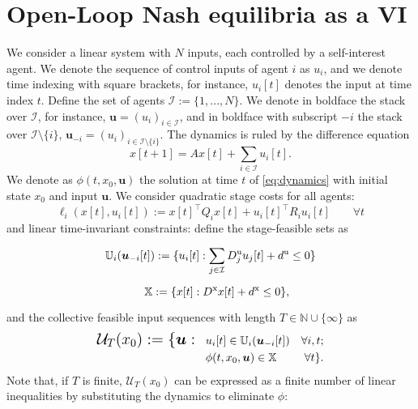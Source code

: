 \documentclass[letterpaper, 10 pt, conference]{ieeeconf}  %
\newcommand{\N}{\mathbb{N}}
\newcommand{\mc}{\mathcal}
\newcommand{\bs}{\boldsymbol}
\newcommand{\bu}{\boldsymbol{u}}
\newcommand{\Dx}{D^{\text{x}}}
\newcommand{\Du}{D^{\text{u}}}
\newcommand{\dx}{d^{\text{x}}}
\newcommand{\du}{d^{\text{u}}}
\newcommand{\X}{\mathbb{X}}
\newcommand{\U}{\mathbb{U}}
\begin{document}
\section{Open-Loop Nash equilibria as a VI}\label{sec: OL-NE as VI}
We consider a linear system with $N$ inputs, each controlled by a self-interest agent. We denote the sequence of control inputs of agent $i$ as $u_i$, and we denote time indexing with square brackets, for instance, $u_i[t]$ denotes the input at time index $t$. Define the set of agents $\mc I:=\{1,...,N\}$. We denote in boldface the stack over $\mc I$, for instance, $\bs{u}=(u_i)_{i\in\mc I}$, and in boldface with subscript $-i$ the stack over $\mc I \setminus \{i\}$, $\bs{u}_{-i}=(u_i)_{i\in\mc I \setminus \{i\}}$. The dynamics is ruled by the difference equation
\begin{equation}\label{eq:dynamics}
    x[t+1] = Ax[t] + \sum_{i\in\mc I} u_i[t].
\end{equation} 
We denote as $\phi(t, x_0, \bu)$ the solution at time $t$ of \eqref{eq:dynamics} with initial state $x_0$ and input $\bu$. We consider quadratic stage costs for all agents:
\begin{equation}
    \ell_i(x[t],u_i[t]):= x[t]^{\top}Q_ix[t] + u_i[t]^{\top}R_iu_i[t] \qquad \forall t
\end{equation}
and linear time-invariant constraints: define the stage-feasible sets as
\begin{align}
    \mathbb{U}_i(\bu_{-i}[t]):=\Large\{ u_i[t]: \sum_{j\in \mc I} \Du_j u_j[t] + \du &\leq 0 \Large\} \\
    \mathbb{X}:= \{x[t]: \Dx x[t]+ \dx \leq 0 \},
\end{align}
and the collective feasible input sequences with length $T\in\N\cup\{\infty\}$ as 
\begin{align}
        \mc{U}_T(x_0):= \large\{ \bu:~~ &u_i[t] \in \U_i(\bu_{-i}[t]) &\forall i,t; \\
         &\phi(t,x_0,\bu) \in\X &\forall t\large\}.
\end{align}
Note that, if $T$ is finite, $\mc U_T(x_0)$ can be expressed as a finite number of linear inequalities by substituting the dynamics to eliminate $\phi$: 
\end{document}
